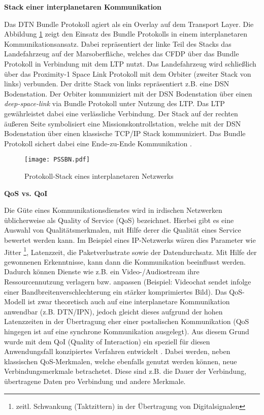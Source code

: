 \textbf{Stack einer interplanetaren Kommunikation}

Das \gls{DTN} Bundle Protokoll agiert als ein Overlay auf dem Transport Layer. Die
Abbildung \ref{fig:PSSBN} zeigt den Einsatz des Bundle Protokolls in einem
interplanetaren Kommunikationsansatz.
Dabei repr{\"a}sentiert der linke Teil des Stacks das Landefahrzeug auf der
Marsoberfl{\"a}che, welches das \gls{CFDP} {\"u}ber das Bundle Protokoll in
Verbindung mit dem \gls{LTP} nutzt.
Das Landefahrzeug wird schlie{\ss}lich {\"u}ber das Proximity-1 Space Link
Protokoll mit dem Orbiter (zweiter Stack von links) verbunden. Der dritte Stack
von links repr{\"a}sentiert z.B. eine \gls{DSN} Bodenstation. Der
Orbiter kommuniziert mit der \gls{DSN} Bodenstation {\"u}ber einen
\textit{deep-space-link} via Bundle Protokoll unter Nutzung des \gls{LTP}. Das
\gls{LTP} gew{\"a}hrleistet dabei eine verl{\"a}ssliche Verbindung. Der Stack
auf der rechten {\"a}u{\ss}eren Seite symbolisiert eine Missionskontrollstation,
welche mit der \gls{DSN} Bodenstation {\"u}ber einen klassische
\gls{TCP}/\gls{IP} Stack kommuniziert. Das Bundle Protokoll sichert dabei eine
Ende-zu-Ende Kommunikation \cite{DTNBundle}.

\begin{figure}[H]
\centering
\texttt{[image: PSSBN.pdf]}
\caption[Protokoll-Stack eines interplanetaren Netzwerks]
{Protokoll-Stack eines interplanetaren Netzwerks \cite{DTNBundle}}
\label{fig:PSSBN}
\end{figure}

\textbf{\gls{QoS} vs. \gls{QoI}}

Die G{\"u}te eines Kommunikationsdienstes wird in irdischen Netzwerken
{\"u}blicherweise als Quality of Service (QoS) bezeichnet. Hierbei gibt es eine
Auswahl von Qualit{\"a}tsmerkmalen, mit Hilfe derer die Qualit{\"a}t eines
Service bewertet werden kann. Im Beispiel eines IP-Netzwerks w{\"a}ren dies
Parameter wie Jitter \footnote{zeitl. Schwankung (Taktzittern) in der
{\"U}bertragung von Digitalsignalen}, Latenzzeit, die Paketverlustrate sowie der
Datendurchsatz. Mit Hilfe der gewonnenen Erkenntnisse, kann dann die
Kommunikation beeinflusst werden. Dadurch k{\"o}nnen Dienste wie z.B. ein
Video-/Audiostream ihre Ressourcennutzung verlagern bzw. anpassen
(Beispiel: Videochat sendet infolge einer Bandbreitenverschlechterung ein
st{\"a}rker komprimiertes Bild). Das QoS-Modell ist zwar theoretisch auch auf
eine interplanetare Kommunikation anwendbar (z.B. DTN/IPN), jedoch gleicht
dieses aufgrund der hohen Latenzzeiten in der {\"U}bertragung eher einer
postalischen Kommunikation (QoS hingegen ist auf eine synchrone Kommunikation
ausgelegt). Aus diesem Grund wurde mit dem QoI (Quality of Interaction) ein
speziell f{\"u}r diesen Anwendungsfall konzipiertes Verfahren entwickelt
\cite{Daher2}. Dabei werden, neben klassischen QoS-Merkmalen, welche ebenfalls
genutzt werden k{\"o}nnen, neue Verbindungsmerkmale betrachetet.
Diese sind z.B. die Dauer der Verbindung, {\"u}bertragene Daten pro Verbindung
und andere Merkmale.

